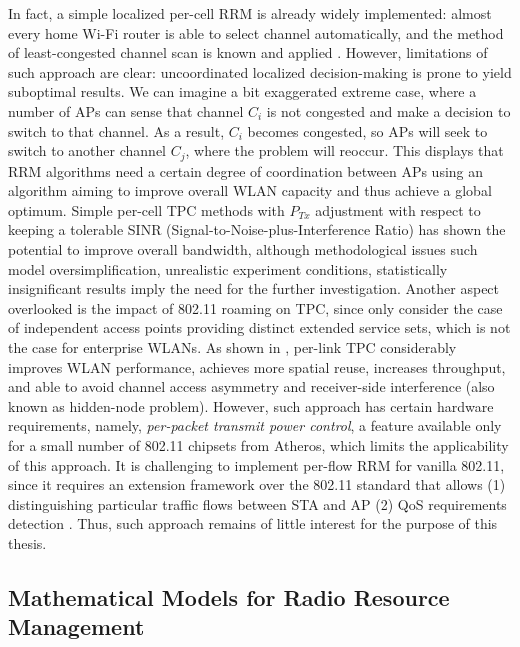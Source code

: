 In fact, a simple localized per-cell RRM is already widely implemented: almost every home Wi-Fi router is able to select channel automatically, and the method of least-congested channel scan is known and applied \cite{achantaMethodApparatusLeast2006}. However, limitations of such approach are clear: uncoordinated localized decision-making is prone to yield suboptimal results. We can imagine a bit exaggerated extreme case, where a number of APs can sense that channel $C_i$ is not congested and make a decision to switch to that channel. As a result, $C_i$ becomes congested, so APs will seek to switch to another channel $C_j$, where the problem will reoccur. This displays that RRM algorithms need a certain degree of coordination between APs using an algorithm aiming to improve overall WLAN capacity and thus achieve a global optimum.
Simple per-cell TPC methods with $P_{Tx}$ adjustment with respect to keeping a tolerable SINR (Signal-to-Noise-plus-Interference Ratio) has shown \cite{michalskiSimplePerformanceboostingAlgorithm2016,kazminIspolzovanieNeyronnyhSetey2021} the potential to improve overall bandwidth, although methodological issues such model oversimplification, unrealistic experiment conditions, statistically insignificant results imply the need for the further investigation. Another aspect overlooked is the impact of 802.11 roaming on TPC, since \cite{michalskiSimplePerformanceboostingAlgorithm2016,kazminIspolzovanieNeyronnyhSetey2021} only consider the case of independent access points providing distinct extended service sets, which is not the case for enterprise WLANs.
As shown in \cite{ramachandranSymphonySynchronousTwophase2008}, per-link TPC considerably improves WLAN performance, achieves more spatial reuse, increases throughput, and able to avoid channel access asymmetry and receiver-side interference (also known as hidden-node problem). However, such approach has certain hardware requirements, namely, \textit{per-packet transmit power control}, a feature available only for a small number of 802.11 chipsets from Atheros, which limits the applicability of this approach.
It is challenging to implement per-flow RRM for vanilla 802.11, since it requires an extension framework over the 802.11 standard that allows (1) distinguishing particular traffic flows between STA and AP (2) QoS requirements detection \cite{bouhafsPerFlowRadioResource2020}. Thus, such approach remains of little interest for the purpose of this thesis.


\subsection{Mathematical Models for Radio Resource Management}
\label{chap:lr:sec:math_models}

